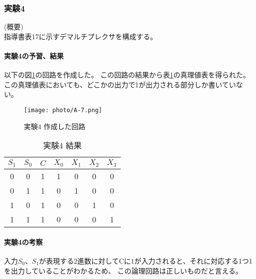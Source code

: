 \documentclass[dvipdfmx]{jsarticle}
\begin{document}
\subsubsection{実験4}
(概要)\\
指導書\cite[p.3-11]{degital}表17に示すデマルチプレクサを構成する。
\paragraph*{実験4の予習、結果}
以下の図\ref*{fig:A-7}の回路を作成した。
この回路の結果から表\ref*{tb:A-10}の真理値表を得られた。
この真理値表においても、どこかの出力で1が出力される部分しか書いていない。

\begin{figure}[hbtp]
  \begin{center}
    \texttt{[image: photo/A-7.png]}
  \end{center}
  \caption{実験4 作成した回路}
  \label{fig:A-7}
\end{figure}

\begin{table}[hbtp]
  \centering
  \caption{実験4 結果}
  \begin{tabular}{|c|c|c||c|c|c|c|} \hline
    $S_1$ & $S_0$ & $C$ & $X_0$ & $X_1$ & $X_2$ & $X_3$ \\ \hline\hline
    0 & 0 & 1 & 1 & 0 & 0 & 0 \\ \hline
    0 & 1 & 1 & 0 & 1 & 0 & 0\\ \hline
    1 & 0 & 1 & 0 & 0 & 1 & 0\\ \hline
    1 & 1 & 1 & 0 & 0 & 0 & 1\\ \hline
  \end{tabular}
  \label{tb:A-10}
\end{table}

\paragraph*{実験4の考察}

入力$S_0$、$S_1$が表現する2進数に対してCに$1$が入力されると、それに対応する1つ1を出力していることがわかるため、
この論理回路は正しいものだと言える。
\end{document}

